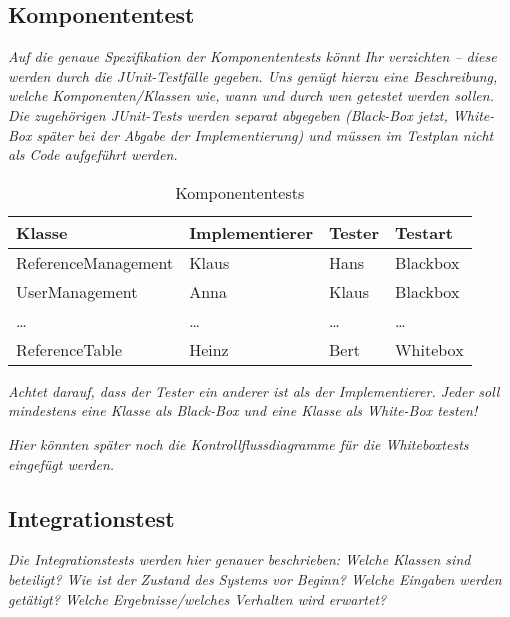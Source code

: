\documentclass[fontsize=12pt,paper=a4,twoside]{scrartcl}
\begin{document}
\subsection{Komponententest}\label{c10-0}

{\em Auf die genaue Spezifikation der Komponententests könnt Ihr
  verzichten -- diese werden durch die JUnit-Testfälle gegeben. Uns
  genügt hierzu eine Beschreibung, welche Komponenten/Klassen wie,
  wann und durch wen getestet werden sollen. Die zugehörigen
  JUnit-Tests werden separat abgegeben (Black-Box jetzt, White-Box
  später bei der Abgabe der Implementierung) und müssen im Testplan
  nicht als Code aufgeführt werden.}

\begin{table}[h]
\centering
\begin{tabular}{|l|p{3cm}|p{3cm}|l|}
\hline
Klasse & Implementierer & Tester & Testart \\
\hline
ReferenceManagement & Klaus  & Hans    & Blackbox \\
UserManagement      & Anna   & Klaus   & Blackbox \\
\dots               & \dots  & \dots   & \dots \\
ReferenceTable      & Heinz  & Bert    & Whitebox \\
\hline
\end{tabular}
\caption{Komponententests}
\label{tab:komponententests}
\end{table}

{\em Achtet darauf, dass der Tester ein anderer ist als der
  Implementierer. Jeder soll mindestens eine Klasse als Black-Box und
  eine Klasse als White-Box testen!}

{\em Hier könnten später noch die Kontrollflussdiagramme für die
  Whiteboxtests eingefügt werden.}

\clearpage
\subsection{Integrationstest}\label{c10a}

{\em Die Integrationstests werden hier genauer beschrieben: Welche
  Klassen sind beteiligt? Wie ist der Zustand des Systems vor Beginn?
  Welche Eingaben werden getätigt? Welche Ergebnisse/welches Verhalten
  wird erwartet?}
\end{document}
